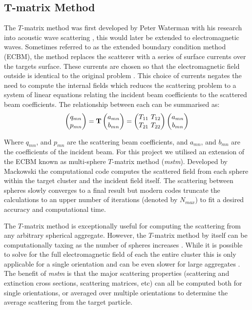 \subsection{T-matrix Method}
The $T$-matrix method was first developed by Peter Waterman with his
research into acoustic wave scattering \cite{Waterman1969}, this 
would later be extended to electromagnetic waves. Sometimes  
referred to as the extended boundary condition method (ECBM), 
the method replaces the scatterer with a series of surface currents
over the targets surface. These currents are chosen so that the
electromagnetic field outside is identical to the original problem 
\cite{Wriedt1998}. This choice of currents negates the need to 
compute the internal fields which reduces the scattering problem 
to a system of linear equations relating the incident beam coefficients 
to the scattered beam coefficients. The relationship between each can 
be summarised as:
\begin{align}
	\label{eq:t_matrix}
	\begin{pmatrix}
		q_{mn} \\
		p_{mn} 
	\end{pmatrix}
	= \bold{T} 
	\begin{pmatrix}
		a_{mn} \\
		b_{mn}
	\end{pmatrix}
	= \begin{pmatrix}
		T_{11} \ T_{12} \\
		T_{21} \ T_{22}
	\end{pmatrix}
	\begin{pmatrix}
		a_{mn} \\
		b_{mn}
	\end{pmatrix}
\end{align}

Where $q_{mn}$, and $p_{mn}$ are the scattering beam coefficients, 
and $a_{mn}$, and $b_{mn}$ are the coefficients of the incident beam. 
For this project we utilised an extension of the ECBM known as 
multi-sphere $T$-matrix method (\textit{mstm}). Developed by Mackowski
\cite{Mackowski2011} the computational code computes the scattered 
field from each sphere within the target cluster and the incident 
field itself. The scattering between spheres slowly converges to a 
final result but modern codes truncate the calculations to an upper 
number of iterations (denoted by $N_{max}$) to fit a desired accuracy 
and computational time. 

The $T$-matrix method is exceptionally useful for computing the 
scattering from any arbitrary spherical aggregate. However, the 
$T$-matrix method by itself can be computationally taxing as the 
number of spheres increases \cite{Mackowski2011}. While it is 
possible to solve for the full electromagnetic field of each the 
entire cluster this is only applicable for a single orientation 
and can be even slower for large aggregates \cite{Mackowski1996, 
Xu1995}. The benefit of \textit{mstm} is that the major scattering 
properties (scattering and extinction cross sections, scattering 
matrices, etc) can all be computed both for single orientations, 
or averaged over multiple orientations to determine the average 
scattering from the target particle. 

